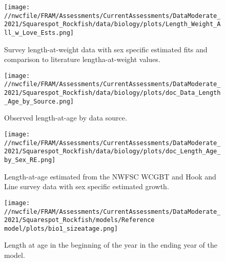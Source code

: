 \documentclass[11pt,
  english,
  a4paper,
]{article}
\begin{document}
\tagmcend\tagstructend


\begin{figure}
\centering
\texttt{[image: //nwcfile/FRAM/Assessments/CurrentAssessments/DataModerate\_2021/Squarespot\_Rockfish/data/biology/plots/Length\_Weight\_All\_w\_Love\_Ests.png]}
\caption{Survey length-at-weight data with sex specific estimated fits and comparison to literature lengtha-at-weight values.\label{fig:len-weight}}
\end{figure}

\tagmcend\tagstructend


\begin{figure}
\centering
\texttt{[image: //nwcfile/FRAM/Assessments/CurrentAssessments/DataModerate\_2021/Squarespot\_Rockfish/data/biology/plots/doc\_Data\_Length\_Age\_by\_Source.png]}
\caption{Observed length-at-age by data source.\label{fig:len-age-data}}
\end{figure}

\tagmcend\tagstructend


\begin{figure}
\centering
\texttt{[image: //nwcfile/FRAM/Assessments/CurrentAssessments/DataModerate\_2021/Squarespot\_Rockfish/data/biology/plots/doc\_Length\_Age\_by\_Sex\_RE.png]}
\caption{Length-at-age estimated from the NWFSC WCGBT and Hook and Line survey data with sex specific estimated growth.\label{fig:len-age}}
\end{figure}

\tagmcend\tagstructend


\begin{figure}
\centering
\texttt{[image: //nwcfile/FRAM/Assessments/CurrentAssessments/DataModerate\_2021/Squarespot\_Rockfish/models/Reference model/plots/bio1\_sizeatage.png]}
\caption{Length at age in the beginning of the year in the ending year of the model.\label{fig:len-age-ss}}
\end{figure}
\end{document}
